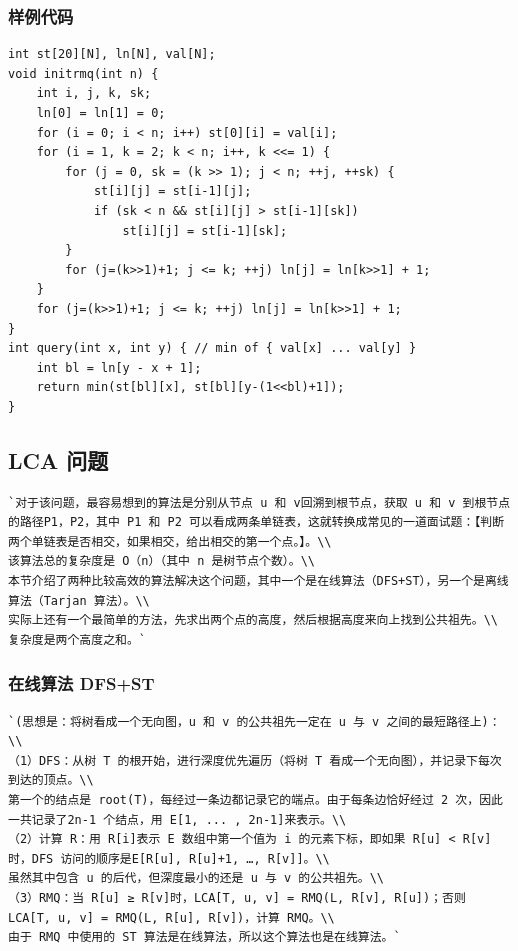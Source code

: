 \documentclass[a4paper]{article}
\begin{document}
\begin{CJK*}{UTF8}{gbsn}
\begin{multicols}{3}
\begin{flushleft}
\subsubsection{样例代码}
\begin{lstlisting}
int st[20][N], ln[N], val[N];
void initrmq(int n) {
    int i, j, k, sk;
    ln[0] = ln[1] = 0;
    for (i = 0; i < n; i++) st[0][i] = val[i];
    for (i = 1, k = 2; k < n; i++, k <<= 1) {
        for (j = 0, sk = (k >> 1); j < n; ++j, ++sk) {
            st[i][j] = st[i-1][j];
            if (sk < n && st[i][j] > st[i-1][sk])
                st[i][j] = st[i-1][sk];
        }
        for (j=(k>>1)+1; j <= k; ++j) ln[j] = ln[k>>1] + 1;
    }
    for (j=(k>>1)+1; j <= k; ++j) ln[j] = ln[k>>1] + 1;
}
int query(int x, int y) { // min of { val[x] ... val[y] }
    int bl = ln[y - x + 1];
    return min(st[bl][x], st[bl][y-(1<<bl)+1]);
}
\end{lstlisting}

\subsection{LCA 问题}
\begin{lstlisting}
`对于该问题，最容易想到的算法是分别从节点 u 和 v回溯到根节点，获取 u 和 v 到根节点的路径P1，P2，其中 P1 和 P2 可以看成两条单链表，这就转换成常见的一道面试题：【判断两个单链表是否相交，如果相交，给出相交的第一个点。】。\\
该算法总的复杂度是 O（n）（其中 n 是树节点个数）。\\
本节介绍了两种比较高效的算法解决这个问题，其中一个是在线算法（DFS+ST），另一个是离线算法（Tarjan 算法）。\\
实际上还有一个最简单的方法，先求出两个点的高度，然后根据高度来向上找到公共祖先。\\
复杂度是两个高度之和。`
\end{lstlisting}

\subsubsection{在线算法 DFS+ST}
\begin{lstlisting}
`(思想是：将树看成一个无向图，u 和 v 的公共祖先一定在 u 与 v 之间的最短路径上)：\\
（1）DFS：从树 T 的根开始，进行深度优先遍历（将树 T 看成一个无向图），并记录下每次到达的顶点。\\
第一个的结点是 root(T)，每经过一条边都记录它的端点。由于每条边恰好经过 2 次，因此一共记录了2n-1 个结点，用 E[1, ... , 2n-1]来表示。\\
（2）计算 R：用 R[i]表示 E 数组中第一个值为 i 的元素下标，即如果 R[u] < R[v]时，DFS 访问的顺序是E[R[u], R[u]+1, …, R[v]]。\\
虽然其中包含 u 的后代，但深度最小的还是 u 与 v 的公共祖先。\\
（3）RMQ：当 R[u] ≥ R[v]时，LCA[T, u, v] = RMQ(L, R[v], R[u])；否则 LCA[T, u, v] = RMQ(L, R[u], R[v])，计算 RMQ。\\
由于 RMQ 中使用的 ST 算法是在线算法，所以这个算法也是在线算法。`


\end{lstlisting}
\end{flushleft}
\end{multicols}
\end{CJK*}
\end{document}
